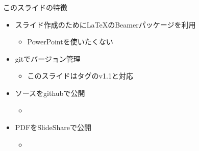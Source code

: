 \begin{frame}{このスライドの特徴}
 \begin{itemize}
  \item スライド作成のために\LaTeX のBeamerパッケージを利用
        \begin{itemize}
         \item PowerPointを使いたくない
        \end{itemize}
  \item gitでバージョン管理
        \begin{itemize}
         \item このスライドはタグのv1.1と対応
        \end{itemize}
  \item ソースをgithubで公開
\begin{itemize}
 \item \href{https://github.com/sakabar/prml_titech_2-3-1_2-3-7}{}
\end{itemize}
  \item PDFをSlideShareで公開
\begin{itemize}
 \item \href{http://www.slideshare.net/takafumisakakibara75/slide-41820194}{}
\end{itemize}

 \end{itemize}
\end{frame}
